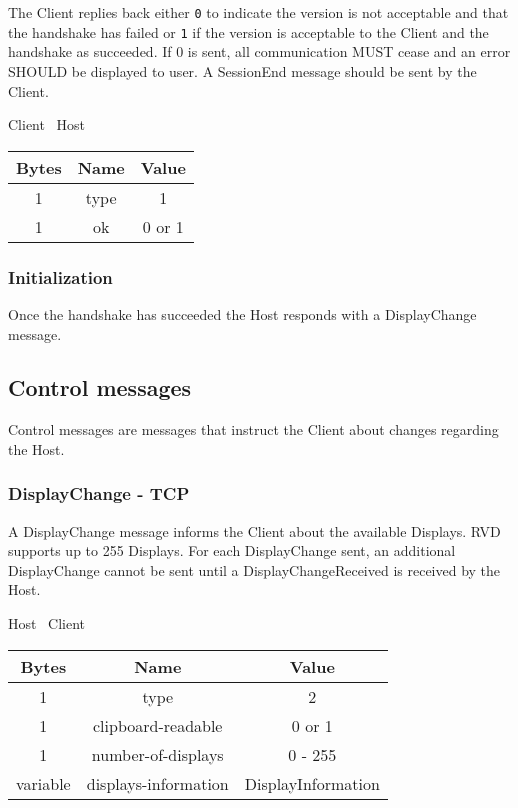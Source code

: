 The Client replies back either \texttt{0} to indicate the version is not acceptable and that the handshake has
failed or \texttt{1} if the version is acceptable to the Client and the handshake as succeeded. If 0 is sent, all
communication MUST cease and an error SHOULD be displayed to user. A SessionEnd message should be sent by
the Client.

\begin{center}
    Client \textrightarrow\ Host\\
    \begin{tabular}{|c|c|c|}
        \hline
        \textbf{Bytes} & \textbf{Name} & \textbf{Value} \\
        \hline
        1              & type                 & 1                  \\
        \hline
        1              & ok            & 0 or 1         \\
        \hline
    \end{tabular}
\end{center}

\subsubsection{Initialization}

Once the handshake has succeeded the Host responds with a DisplayChange message.

\subsection{Control messages}
Control messages are messages that instruct the Client about changes regarding the Host.

\subsubsection{DisplayChange - TCP}
A DisplayChange message informs the Client about the available Displays. RVD supports up to 255
Displays. For each DisplayChange sent, an additional DisplayChange cannot be sent until a DisplayChangeReceived is
received by the Host.

\begin{center}
    Host \textrightarrow\ Client\\
    \begin{tabular}{|c|c|c|}
        \hline
        \textbf{Bytes} & \textbf{Name}        & \textbf{Value}     \\
        \hline
        1              & type                 & 2                  \\
        \hline
        1              & clipboard-readable   & 0 or 1             \\
        \hline
        1              & number-of-displays   & 0 - 255            \\
        \hline
        variable       & displays-information & DisplayInformation \\
        \hline
    \end{tabular}
\end{center}


